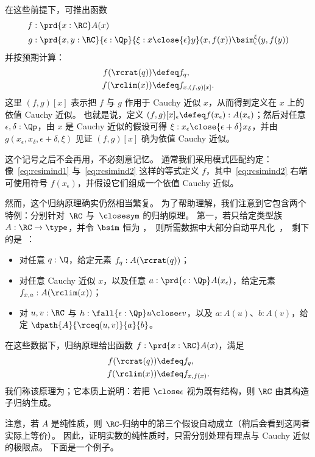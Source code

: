 在这些前提下，可推出函数
\begin{align*}
  f&:\prd{x:\RC} A(x)\\
  g&:\prd{x,y:\RC}{\epsilon:\Qp}{\xi:x\close{\epsilon} y}
  (x,f(x)) \bsim_\epsilon^\xi (y,f(y))
\end{align*}
并按预期计算：
\begin{align}
  f(\rcrat(q)) &\defeq f_q, \label{eq:rcsimind1}\\
  f(\rclim(x)) &\defeq f_{x,(f,g)[x]}. \label{eq:rcsimind2}
\end{align}
这里 $(f,g)[x]$ 表示把 $f$ 与 $g$ 作用于 Cauchy 近似 $x$，从而得到定义在 $x$ 上的依值 Cauchy 近似。
也就是说，定义 $(f,g)[x]_\epsilon \defeq f(x_\epsilon) : A(x_\epsilon)$；然后对任意 $\epsilon,\delta:\Qp$，由 $x$ 是 Cauchy 近似的假设可得 $\xi: x_\epsilon \close{\epsilon+\delta} x_\delta$，并由 $g(x_\epsilon,x_\delta,\epsilon+\delta,\xi)$ 见证 $(f,g)[x]$ 确为依值 Cauchy 近似。

这个记号之后不会再用，不必刻意记忆。
通常我们采用模式匹配约定：像~\eqref{eq:rcsimind1} 与~\eqref{eq:rcsimind2} 这样的等式定义 $f$，其中~\eqref{eq:rcsimind2} 右端可使用符号 $f(x_\epsilon)$，并假设它们组成一个依值 Cauchy 近似。

然而，这个归纳原理确实仍然相当繁复。
为了帮助理解，我们注意到它包含两个特例：分别针对~$\RC$ 与~$\closesym$ 的归纳原理。
第一，若只给定类型族 $A:\RC\to\type$，并令 $\bsim$ 恒为 \unit，则所需数据中大部分自动平凡化，剩下的是：
\begin{itemize}
\item 对任意 $q : \Q$，给定元素 $f_q:A(\rcrat(q))$；
\item 对任意 Cauchy 近似 $x$，以及任意 $a:\prd{\epsilon:\Qp} A(x_\epsilon)$，给定元素 $f_{x,a}:A(\rclim(x))$；
\item 对 $u, v : \RC$ 与 $h:\fall{\epsilon : \Qp} u \close\epsilon v$，以及 $a:A(u)$、$b:A(v)$，给定 $\dpath{A}{\rceq(u,v)}{a}{b}$。
\end{itemize}
在这些数据下，归纳原理给出函数 $f:\prd{x:\RC} A(x)$，满足
\begin{align*}
  f(\rcrat(q)) &\defeq f_q,\\
  f(\rclim(x)) &\defeq f_{x,f(x)}.
\end{align*}
我们称该原理为；它本质上说明：若把 $\close\epsilon$ 视为既有结构，则 $\RC$ 由其构造子归纳生成。

注意，若 $A$ 是纯性质，则 $\RC$-归纳中的第三个假设自动成立（稍后会看到这两者实际上等价）。
因此，证明实数的纯性质时，只需分别处理有理点与 Cauchy 近似的极限点。
下面是一个例子。

